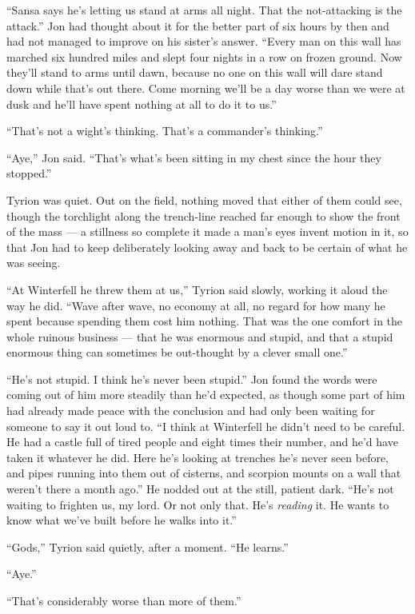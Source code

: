 “Sansa says he’s letting us stand at arms all night. That the not-attacking is the attack.” Jon had thought about it for the better part of six hours by then and had not managed to improve on his sister’s answer. “Every man on this wall has marched six hundred miles and slept four nights in a row on frozen ground. Now they’ll stand to arms until dawn, because no one on this wall will dare stand down while that’s out there. Come morning we’ll be a day worse than we were at dusk and he’ll have spent nothing at all to do it to us.”

“That’s not a wight’s thinking. That’s a commander’s thinking.”

“Aye,” Jon said. “That’s what’s been sitting in my chest since the hour they stopped.”

Tyrion was quiet. Out on the field, nothing moved that either of them could see, though the torchlight along the trench-line reached far enough to show the front of the mass — a stillness so complete it made a man’s eyes invent motion in it, so that Jon had to keep deliberately looking away and back to be certain of what he was seeing.

“At Winterfell he threw them at us,” Tyrion said slowly, working it aloud the way he did. “Wave after wave, no economy at all, no regard for how many he spent because spending them cost him nothing. That was the one comfort in the whole ruinous business — that he was enormous and stupid, and that a stupid enormous thing can sometimes be out-thought by a clever small one.”

“He’s not stupid. I think he’s never been stupid.” Jon found the words were coming out of him more steadily than he’d expected, as though some part of him had already made peace with the conclusion and had only been waiting for someone to say it out loud to. “I think at Winterfell he didn’t need to be careful. He had a castle full of tired people and eight times their number, and he’d have taken it whatever he did. Here he’s looking at trenches he’s never seen before, and pipes running into them out of cisterns, and scorpion mounts on a wall that weren’t there a month ago.” He nodded out at the still, patient dark. “He’s not waiting to frighten us, my lord. Or not only that. He’s \textit{reading} it. He wants to know what we’ve built before he walks into it.”

“Gods,” Tyrion said quietly, after a moment. “He learns.”

“Aye.”

“That’s considerably worse than more of them.”

